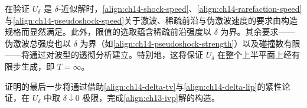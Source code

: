 \documentclass[../../main.tex]{subfiles}
\begin{document}
在验证 $U_\delta$ 是 $\delta$-近似解时，\eqref{align:ch14-shock-speed}、\eqref{align:ch14-rarefaction-speed}与\eqref{align:ch14-pseudoshock-speed}关于激波、稀疏前沿与伪激波速度的要求由构造规格而显然满足。此外，限值的选取蕴含稀疏前沿强度以 $\delta$ 为界。其余要求——伪激波总强度也以 $\delta$ 为界（如\eqref{align:ch14-pseudoshock-strength}）以及碰撞数有限——将通过对波型的透彻分析建立。特别地，这将保证 $U_\delta$ 在整个上半平面上经有限步生成，即 $T=\infty$。

证明的最后一步将通过借助\eqref{align:ch14-delta-tv}与\eqref{align:ch14-delta-lip}的紧性论证，在 $U_\delta$ 中取 $\delta\downarrow0$ 极限，完成\eqref{align:ch13-ivp}解的构造。
\end{document}
